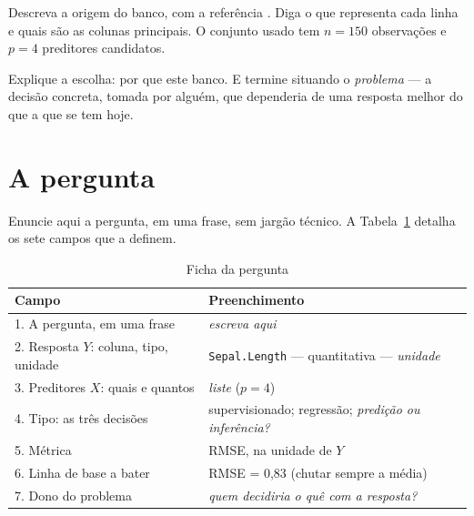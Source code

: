 \documentclass[
  article,
  12pt,
  oneside,
  a4paper,
  english,
  brazil
]{abntex2}\usepackage[]{graphicx}\usepackage[]{xcolor}
\begin{document}
Descreva a origem do banco, com a referência \cite{fonte_dados}. Diga o que
representa cada linha e quais são as colunas principais. O conjunto usado tem
$n = \text{150}$ observações e $p = \text{4}$ preditores candidatos.

Explique a escolha: por que este banco. E termine situando o \emph{problema} ---
a decisão concreta, tomada por alguém, que dependeria de uma resposta melhor do
que a que se tem hoje.

\section{A pergunta}

Enuncie aqui a pergunta, em uma frase, sem jargão técnico. A
Tabela~\ref{tab:ficha} detalha os sete campos que a definem.

\begin{table}[htb]
  \centering
  \caption{Ficha da pergunta}
  \label{tab:ficha}
  \small
  \begin{tabular}{@{}p{}p{}@{}}
    \toprule
    \textbf{Campo} & \textbf{Preenchimento} \\
    \midrule
    1. A pergunta, em uma frase & \textit{escreva aqui} \\
    2. Resposta $Y$: coluna, tipo, unidade & \texttt{Sepal.Length} ---
       quantitativa --- \textit{unidade} \\
    3. Preditores $X$: quais e quantos & \textit{liste} \quad ($p = \text{4}$) \\
    4. Tipo: as três decisões & supervisionado; regress\~ao;
       \textit{predição ou inferência?} \\
    5. Métrica & RMSE, na unidade de $Y$ \\
    6. Linha de base a bater & RMSE = 0,83 \quad (chutar sempre a m\'edia) \\
    7. Dono do problema & \textit{quem decidiria o quê com a resposta?} \\
    \bottomrule
  \end{tabular}
\end{table}
\end{document}

